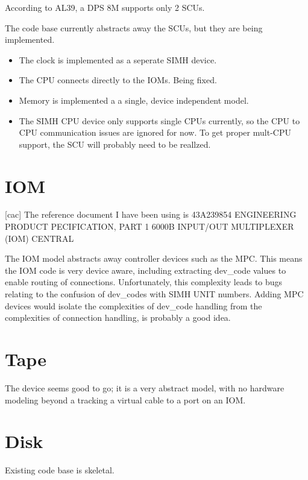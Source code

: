 \documentclass[notitlepage]{report}
\begin{document}
According to AL39, a DPS 8M supports only 2 SCUs.

The code base currently abstracts away the SCUs, but they are being implemented.


\begin{itemize}

\item The clock is implemented as a seperate SIMH device.

\item The CPU connects directly to the IOMs. Being fixed.

\item Memory is implemented a a single, device independent model.

\item The SIMH CPU device only supports single CPUs currently, so the CPU to CPU communication issues are ignored for now. To get proper mult-CPU support, the SCU will probably need to be reallzed.
\end {itemize}

\section {IOM}

[cac] The reference document I have been using is 43A239854 ENGINEERING PRODUCT PECIFICATION, PART 1 6000B INPUT/OUT MULTIPLEXER (IOM) CENTRAL

The IOM model abstracts away controller devices such as the MPC. This means the
IOM code is very device aware, including extracting dev\_code values to enable
routing of connections. Unfortunately, this complexity leads to bugs relating
to the confusion of dev\_codes with SIMH UNIT numbers. Adding MPC devices would
isolate the complexities of dev\_code handling from the complexities of
connection handling, is probably a good idea.

\section {Tape}

The device seems good to go; it is a very abstract model, with no hardware modeling beyond a tracking a virtual cable to a port on an IOM.

\section {Disk}

Existing code base is skeletal.
\end{document}
